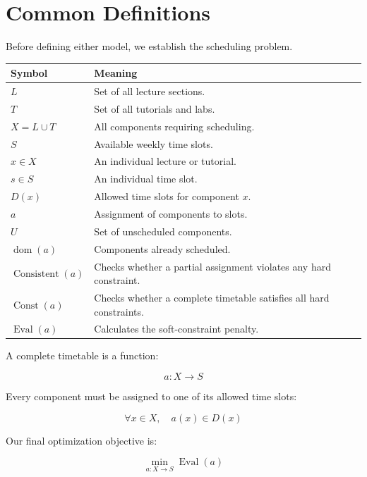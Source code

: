 \documentclass[11pt,letterpaper]{article}
\newcommand{\Const}{\operatorname{Const}}
\newcommand{\Consistent}{\operatorname{Consistent}}
\newcommand{\Eval}{\operatorname{Eval}}
\newcommand{\dom}{\operatorname{dom}}
\begin{document}
\section{Common Definitions}

Before defining either model, we establish the
scheduling problem.

\begin{tabularx}{\linewidth}{@{}lX@{}}
\toprule
\textbf{Symbol} & \textbf{Meaning}\\
\midrule
$L$ & Set of all lecture sections.\\
$T$ & Set of all tutorials and labs.\\
$X=L\cup T$ & All components requiring scheduling.\\
$S$ & Available weekly time slots.\\
$x\in X$ & An individual lecture or tutorial.\\
$s\in S$ & An individual time slot.\\
$D(x)$ & Allowed time slots for component $x$.\\
$a$ & Assignment of components to slots.\\
$U$ & Set of unscheduled components.\\
$\dom(a)$ & Components already scheduled.\\
$\Consistent(a)$ & Checks whether a partial assignment violates any hard constraint.\\
$\Const(a)$ & Checks whether a complete timetable satisfies all hard constraints.\\
$\Eval(a)$ & Calculates the soft-constraint penalty.\\
\bottomrule
\end{tabularx}

A complete timetable is a function:

\begin{equation}
\boxed{a:X\rightarrow S}
\end{equation}

Every component must be assigned to one
of its allowed time slots:

\begin{equation}
\forall x\in X,\quad a(x)\in D(x)
\end{equation}

Our final optimization objective is:

\begin{equation}
\boxed{
\min_{a:X\rightarrow S}\Eval(a)
}
\end{equation}
\end{document}
